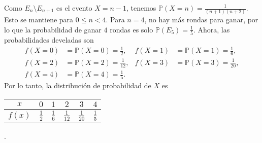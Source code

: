 \begin{solutionorbox}
		Como $E_{n}\setminus E_{n+1}$ es el evento $X=n-1$, tenemos $\mathds{P}\left(X=n\right)=\tfrac{1}{\left(n+1\right)\left(n+2\right)}$. Esto se mantiene para $0\le n< 4$. Para $n=4$, no hay más rondas para ganar, por lo que la probabilidad de ganar $4$ rondas es solo $\mathds{P}\left(E_{5}\right)=\tfrac{1}{5}$. Ahora, las probabilidades develadas son 
		\begin{align*}
			f(X=0) &= \mathds{P}\left(X=0\right)=\frac{1}{2},	& 	f(X=1)	&= \mathds{P}\left(X=1\right)=\frac{1}{6}, \\
			f(X=2) &= \mathds{P}\left(X=2\right)=\frac{1}{12},& 	f(X=3)	&= \mathds{P}\left(X=3\right)=\frac{1}{20}, \\
			f(X=4) &= \mathds{P}\left(X=4\right)=\frac{1}{5}.	&						&
		\end{align*}
		Por lo tanto, la distribución de probabilidad de $X$ es

		\centering
		\begin{tabular}{c|ccccc}
			$x$ 	& $0$ & $1$ & $2$ & $3$ & $4$ \\
			\hline
			$f(x)$& $\frac{1}{2}$ & $\frac{1}{6}$ & $\frac{1}{12}$ & $\frac{1}{20}$ & $\frac{1}{5}$
		\end{tabular}\quad.
	\end{solutionorbox}